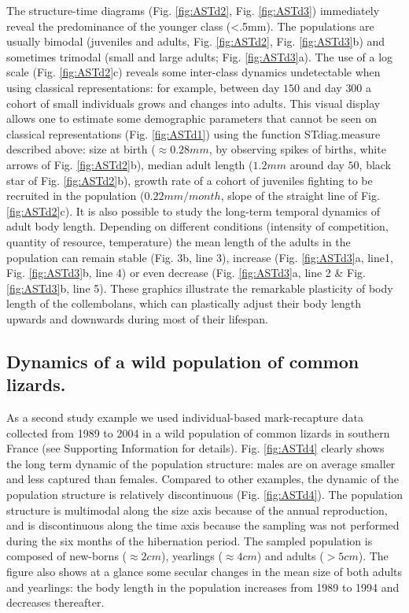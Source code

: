 The structure-time diagrams (Fig. \ref{fig:ASTd2}, Fig. \ref{fig:ASTd3})
immediately reveal the predominance of the younger class (<.5mm). The populations are usually bimodal (juveniles and
adults, Fig. \ref{fig:ASTd2}, Fig. \ref{fig:ASTd3}b) and sometimes trimodal
(small and large adults; Fig.
\ref{fig:ASTd3}a). The use of a log scale (Fig. \ref{fig:ASTd2}c) reveals some
inter-class dynamics undetectable when using classical representations: for
example, between day $150$ and day $300$ a cohort of small individuals grows and
changes into adults. This visual display allows one to estimate some demographic parameters that cannot be
seen on classical representations (Fig. \ref{fig:ASTd1}) using the function
STdiag.measure described above: size at birth ($\approx 0.28mm$, by observing
spikes of births, white arrows of Fig. \ref{fig:ASTd2}b), median adult length
($1.2mm$ around day $50$, black star of Fig. \ref{fig:ASTd2}b), growth rate of a
cohort of juveniles fighting to be recruited in the population ($0.22 mm/month$,
slope of the straight line of Fig. \ref{fig:ASTd2}c). It is also possible to
study the long-term temporal dynamics of adult body length.
Depending on different conditions (intensity of competition, quantity of
resource, temperature) the mean length of the adults in the population can
remain stable (Fig. 3b, line 3), increase (Fig. \ref{fig:ASTd3}a, line1, Fig.
\ref{fig:ASTd3}b, line 4) or even decrease (Fig. \ref{fig:ASTd3}a, line 2 \&
Fig.
\ref{fig:ASTd3}b, line 5).
These graphics illustrate the remarkable plasticity of body length of the collembolans, which can plastically
adjust their body length upwards and downwards during most of their lifespan.

\subsection{Dynamics of a wild population of common lizards.}

As a second study example we used individual-based mark-recapture data collected
from 1989 to 2004 in a wild population of common lizards in southern France (see
Supporting Information for details). Fig. \ref{fig:ASTd4} clearly shows the long
term dynamic of the population structure: males are on average smaller and less captured than
females. Compared to other examples, the dynamic of the population structure is
relatively discontinuous (Fig. \ref{fig:ASTd4}). The population structure is
multimodal along the size axis because of the annual reproduction, and is discontinuous along the
time axis because the sampling was not performed during the six months of the
hibernation period. The sampled population is composed of new-borns
($\approx 2cm$), yearlings ($\approx 4cm$) and adults ($>5cm$). The figure also
shows at a glance some secular changes in the mean size of both adults and yearlings: the body length
in the population increases from 1989 to 1994
\autocites{chamaille-jammes2006a} and decreases thereafter.

